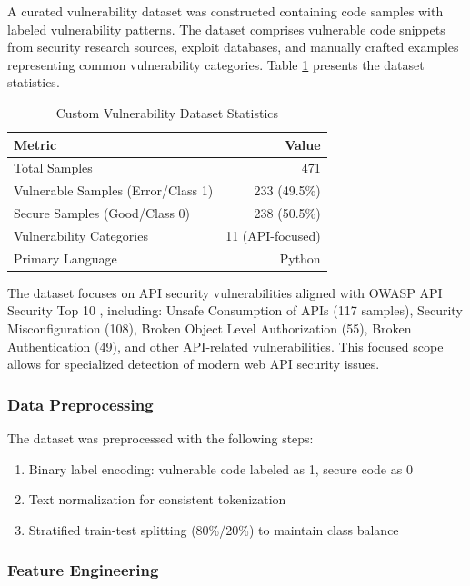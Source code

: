 \documentclass[conference]{IEEEtran}
\begin{document}
A curated vulnerability dataset was constructed containing code samples with labeled vulnerability patterns. The dataset comprises vulnerable code snippets from security research sources, exploit databases, and manually crafted examples representing common vulnerability categories. Table \ref{tab:dataset} presents the dataset statistics.

\begin{table}[h]
\centering
\caption{Custom Vulnerability Dataset Statistics}
\label{tab:dataset}
\begin{tabular}{@{}lr@{}}
\toprule
\textbf{Metric} & \textbf{Value} \\ \midrule
Total Samples & 471 \\
Vulnerable Samples (Error/Class 1) & 233 (49.5\%) \\
Secure Samples (Good/Class 0) & 238 (50.5\%) \\
Vulnerability Categories & 11 (API-focused) \\
Primary Language & Python \\ \bottomrule
\end{tabular}
\end{table}

The dataset focuses on API security vulnerabilities aligned with OWASP API Security Top 10 \cite{owasp2023}, including: Unsafe Consumption of APIs (117 samples), Security Misconfiguration (108), Broken Object Level Authorization (55), Broken Authentication (49), and other API-related vulnerabilities. This focused scope allows for specialized detection of modern web API security issues.

\subsubsection{Data Preprocessing}

The dataset was preprocessed with the following steps:

\begin{enumerate}
    \item Binary label encoding: vulnerable code labeled as 1, secure code as 0
    \item Text normalization for consistent tokenization
    \item Stratified train-test splitting (80\%/20\%) to maintain class balance
\end{enumerate}

\subsubsection{Feature Engineering}
\end{document}
